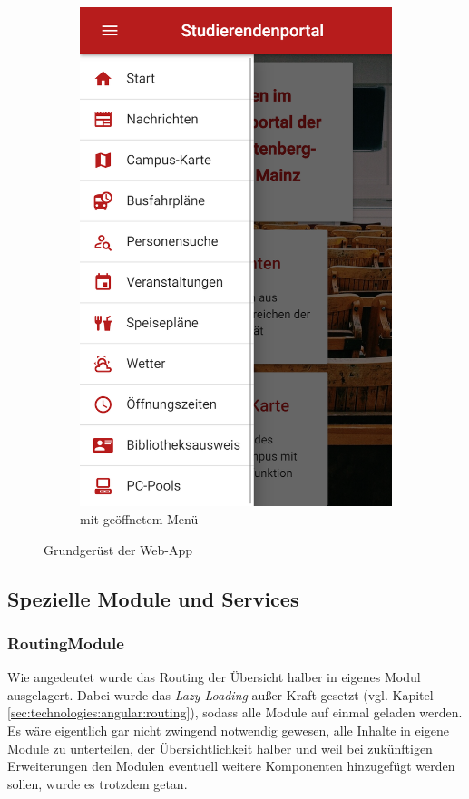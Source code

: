 \begin{figure}
\begin{subfigure}{.5\textwidth}
  \includegraphics[width=.8\linewidth]{gfx/Layout(2)}
  \caption{mit geöffnetem Menü}
  \label{fig:layout2}
\end{subfigure}
\caption{Grundgerüst der Web-App}
\label{fig:layout}
\end{figure}

\subsection{Spezielle Module und Services}
\label{sec:prog:modules}

\subsubsection{RoutingModule}
\label{sec:prog:modules:routing}
Wie angedeutet wurde das Routing der Übersicht halber in eigenes Modul ausgelagert. Dabei wurde das \textit{Lazy Loading} außer Kraft gesetzt (vgl. Kapitel \ref{sec:technologies:angular:routing}), sodass alle Module auf einmal geladen werden. Es wäre eigentlich gar nicht zwingend notwendig gewesen, alle Inhalte in eigene Module zu unterteilen, der Übersichtlichkeit halber und weil bei zukünftigen Erweiterungen den Modulen eventuell weitere Komponenten hinzugefügt werden sollen, wurde es trotzdem getan.

